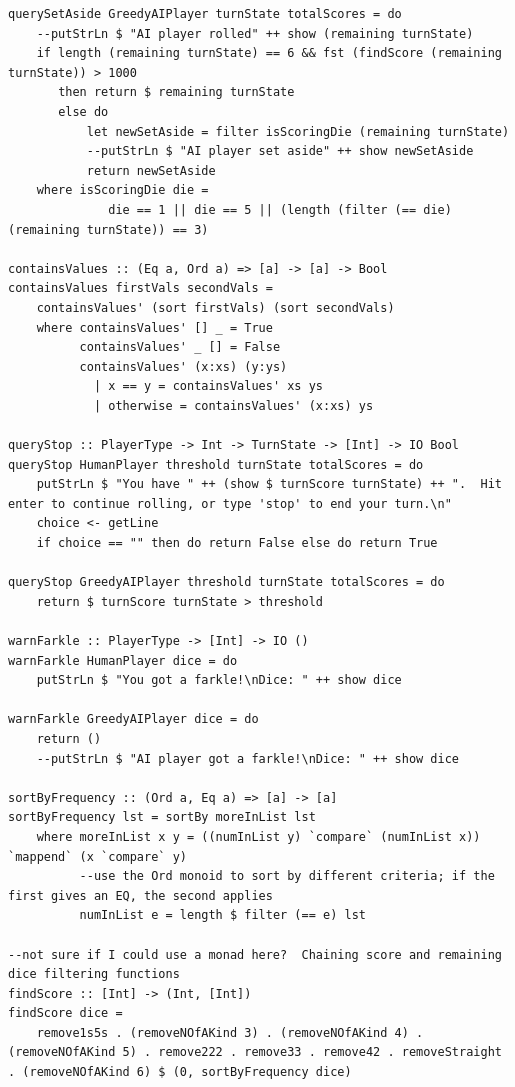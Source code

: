 \documentclass{article}
\begin{document}
\begin{verbatim}
querySetAside GreedyAIPlayer turnState totalScores = do
    --putStrLn $ "AI player rolled" ++ show (remaining turnState)
    if length (remaining turnState) == 6 && fst (findScore (remaining turnState)) > 1000
       then return $ remaining turnState
       else do
           let newSetAside = filter isScoringDie (remaining turnState)
           --putStrLn $ "AI player set aside" ++ show newSetAside
           return newSetAside
    where isScoringDie die =
              die == 1 || die == 5 || (length (filter (== die) (remaining turnState)) == 3)

containsValues :: (Eq a, Ord a) => [a] -> [a] -> Bool
containsValues firstVals secondVals =
    containsValues' (sort firstVals) (sort secondVals)
    where containsValues' [] _ = True
          containsValues' _ [] = False
          containsValues' (x:xs) (y:ys)
            | x == y = containsValues' xs ys
            | otherwise = containsValues' (x:xs) ys
    
queryStop :: PlayerType -> Int -> TurnState -> [Int] -> IO Bool
queryStop HumanPlayer threshold turnState totalScores = do
    putStrLn $ "You have " ++ (show $ turnScore turnState) ++ ".  Hit enter to continue rolling, or type 'stop' to end your turn.\n"
    choice <- getLine
    if choice == "" then do return False else do return True

queryStop GreedyAIPlayer threshold turnState totalScores = do
    return $ turnScore turnState > threshold

warnFarkle :: PlayerType -> [Int] -> IO ()
warnFarkle HumanPlayer dice = do
    putStrLn $ "You got a farkle!\nDice: " ++ show dice

warnFarkle GreedyAIPlayer dice = do
    return ()
    --putStrLn $ "AI player got a farkle!\nDice: " ++ show dice

sortByFrequency :: (Ord a, Eq a) => [a] -> [a]
sortByFrequency lst = sortBy moreInList lst
    where moreInList x y = ((numInList y) `compare` (numInList x)) `mappend` (x `compare` y)
          --use the Ord monoid to sort by different criteria; if the first gives an EQ, the second applies
          numInList e = length $ filter (== e) lst

--not sure if I could use a monad here?  Chaining score and remaining dice filtering functions
findScore :: [Int] -> (Int, [Int])
findScore dice =
    remove1s5s . (removeNOfAKind 3) . (removeNOfAKind 4) . (removeNOfAKind 5) . remove222 . remove33 . remove42 . removeStraight . (removeNOfAKind 6) $ (0, sortByFrequency dice) 


\end{verbatim}
\end{document}
